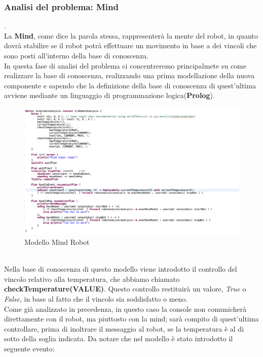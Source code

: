\documentclass{llncs}
\begin{document}
\subsubsection{Analisi del problema:  Mind} .
\label{AnalisidelproblemaReq2Mind}
\vspace*{1ex}
\\
La \textbf{Mind}, come dice la parola stessa, rappresenter\`a la mente del robot, in quanto dovr\`a stabilire se il robot potr\`a effettuare un movimento in base a dei vincoli che sono posti all'interno della base di conoscenza.\\
In questa fase di analisi del problema ci concentreremo principalmete su come realizzare la base di conoscenza, realizzando una prima modellazione della nuova componente e sapendo che la definizione della base di conoscenza di quest'ultima avviene mediante un linguaggio di programmazione logica(\textbf{Prolog}).\\
\begin{figure}
    \centering
    \includegraphics[width=1\textwidth]{Immagini/Requisito2/PAMind(Req2).png}
    \caption{Modello Mind Robot}
    \label{PAMindReq2}
\end{figure}
\vspace*{1ex}
\\
Nella base di conoscenza di questo modello viene introdotto il controllo del vincolo relativo alla temperatura, che abbiamo chiamato \textbf{checkTemperature(VALUE)}. Questo controllo restituir\`a un valore, \textit{True} o \textit{False}, in base al fatto che il vincolo sia soddisfatto o meno.\\
Come gi\`a analizzato in precedenza, in questo caso la console non comunicher\`a direttamente con il robot, ma piuttosto con la mind; sar\`a compito di quest'ultima controllare, prima di inoltrare il messaggio al robot, se la temperatura \`e al di sotto della soglia indicata. Da notare che nel modello \`e stato introdotto il seguente evento:\\
\end{document}
